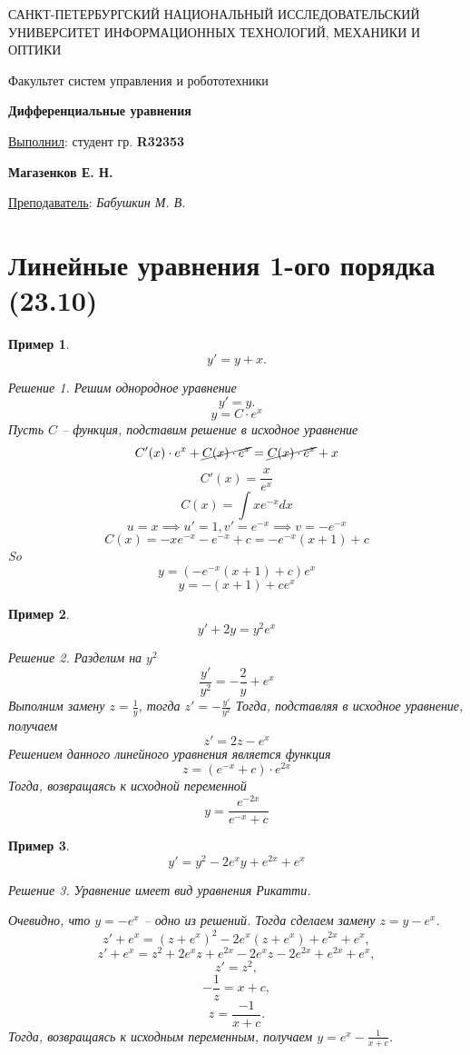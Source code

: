 \documentclass[a5paper, 11pt]{article}
\theoremstyle{definition}
\theoremstyle{plain}
\newtheorem{Ex}{Пример}
\theoremstyle{remark}
\newtheorem*{Solution}{Решение}
\newcommand*{\titlePage}{
	\thispagestyle{title}
	\begingroup
	\begin{center}
		\vspace*{6ex}
		
		{\small
			САНКТ-ПЕТЕРБУРГСКИЙ НАЦИОНАЛЬНЫЙ ИССЛЕДОВАТЕЛЬСКИЙ УНИВЕРСИТЕТ ИНФОРМАЦИОННЫХ ТЕХНОЛОГИЙ, МЕХАНИКИ И ОПТИКИ	
		}
		
		\vspace*{2ex}
		
		{\normalsize
			Факультет систем управления и робототехники
		}
		
		\vspace*{15ex}
		
		{\Large \bfseries 
			Дифференциальные уравнения
		}
	\end{center}
	\vspace*{20ex}
	\begin{flushright}
		{\large 
			\underline{Выполнил}: студент гр. \textbf{R32353}\\
			\begin{flushright}
				\textbf{Магазенков Е. Н.}\\
			\end{flushright}
		}
		
		\vspace*{5ex}
		
		{\large 
			\underline{Преподаватель}: \textit{Бабушкин М. В.}
		}
	\end{flushright}	
	\newpage
	\setcounter{page}{1}
	\endgroup}
\begin{document}
	\titlePage
	\pagestyle{style}	
	\section[23.10.2022]{Линейные уравнения 1-ого порядка (23.10)}
	\begin{Ex}
		\[
		y' = y+x.
		\]
	\begin{Solution}
		Решим однородное уравнение
		\[
		y' = y.
		\]
		\[
		y = C\cdot e^x
		\]
		 Пусть $C$ -- функция, подставим решение в исходное уравнение
		 \[
		 C'(x) \cdot e^x + \cancel{C(x) \cdot e^x} = \cancel{C(x) \cdot e^x} + x
		 \]
		 \[
		 C'(x) = \frac{x}{e^x}
		 \]
		 \[
		 C(x) = \int x{e^{-x}} dx
		 \]
		 \[
		 u = x \implies u'=1, v' = e^{-x} \implies v = -e^{-x}
		 \]
		 \[
		 C(x) = -xe^{-x} - e^{-x} + c = -e^{-x}(x+1) + c
		 \]
		 So 
		 \[
		 y = (-e^{-x}(x+1) + c)e^x
		 \]
		 \[
		 y = -(x+1) + ce^x
		 \]
	\end{Solution}
	\end{Ex}
	
	\begin{Ex}
		\[
		y'+2y=y^2e^x
		\]
		\begin{Solution}
			Разделим на $y^2$
			\[
			\frac{y'}{y^2}  = -\frac{2}{y} + e^x
			\]
			Выполним замену $z = \frac{1}{y}$, тогда $z' = -\frac{y'}{y^2}$
			Тогда, подставляя в исходное уравнение, получаем
			\[
			z' = 2z  - e^x
			\]
			Решением данного линейного уравнения является функция 
			\[
			z = (e^{-x} + c) \cdot e^{2x}
			\]
			Тогда, возвращаясь к исходной переменной
			\[
			y = \frac{e^{-2x}}{e^{-x} + c}
			\]
		\end{Solution}
	\end{Ex}
	\begin{Ex}
		\[
		y' = y^2 -2e^xy+e^{2x}+e^x
		\]
		\begin{Solution}
			Уравнение имеет вид уравнения Рикатти.
			
			Очевидно, что $y=-e^x$ -- одно из решений. Тогда сделаем замену $z = y - e^x$.
			\[
			z' + e^x = (z+e^x)^2 - 2e^x(z+e^x) + e^{2x}+e^x,
			\]
			\[
			z' + e^x = z^2 + 2e^x z + e^{2x}- 2e^x z - 2e^{2x} + e^{2x}+e^x, 
			\]
			\[
			z' = z^2,
			\]
			\[
			-\frac1z = x + c,
			\]
			\[
			z = \frac{-1}{x+c}.
			\]
			Тогда, возвращаясь к исходным переменным, получаем $y=e^x - \frac{1}{x+c}$.
		\end{Solution}
	\end{Ex}
\end{document}
